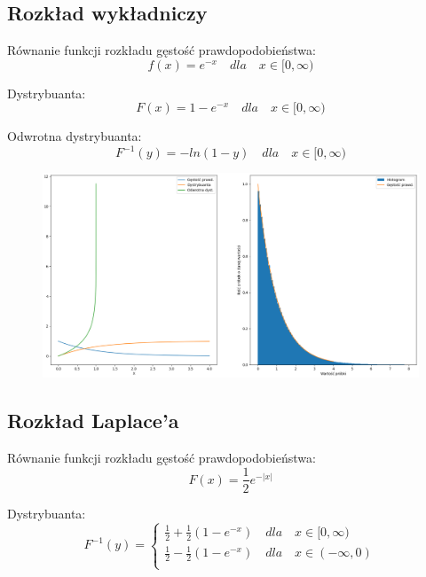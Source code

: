 \documentclass[12pt,a4paper]{article}
\begin{document}
  \subsection{Rozkład wykładniczy}
  
  Równanie funkcji rozkładu gęstość prawdopodobieństwa:
  \begin{equation}
    f(x) = e^{-x}  \quad dla \quad x  \in [0, \infty)
  \end{equation}

  Dystrybuanta:
  \begin{equation}
    F(x) = 1 - e^{-x}  \quad dla \quad x  \in [0, \infty)
  \end{equation}

  Odwrotna dystrybuanta:
  \begin{equation}
    F^{-1}(y) = -ln(1 - y)  \quad dla \quad x  \in [0, \infty)
  \end{equation}


  \begin{figure}[H]
    \centering
    \includegraphics[width=1\textwidth]{figures/Figure_18.png}
    \label{fig:18}
  \end{figure}

  \subsection{Rozkład Laplace'a}
  
  Równanie funkcji rozkładu gęstość prawdopodobieństwa:
  \begin{equation}
    F(x) = \frac{1}{2} e^{-|x|} 
  \end{equation}

  Dystrybuanta:
  \begin{equation}
      F^{-1}(y) = \begin{cases}
            \frac{1}{2} + \frac{1}{2} (1 - e^{-x})  \quad dla \quad x  \in [0, \infty)\\
            \frac{1}{2} - \frac{1}{2} (1 - e^{-x})  \quad dla \quad x  \in (-\infty, 0)\\
          \end{cases}   
  \end{equation}
\end{document}
